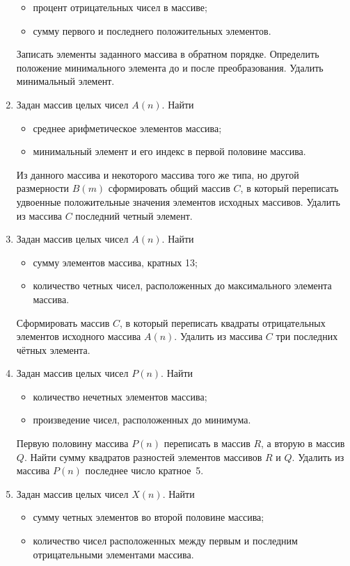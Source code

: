 \begin{enumerate}
\begin{itemize}
\item процент отрицательных чисел в массиве;
\item сумму первого и последнего положительных элементов.
\end{itemize}
Записать элементы заданного массива в обратном порядке. Определить положение минимального элемента до и после
преобразования. Удалить минимальный элемент.
\item Задан массив целых чисел $A(n)$. Найти
\begin{itemize}
\item среднее арифметическое элементов массива;
\item минимальный элемент и его индекс в первой половине массива.
\end{itemize}
Из данного массива и некоторого массива того же типа, но другой размерности $B(m)$
сформировать общий массив $C$, в который переписать удвоенные положительные значения элементов исходных
массивов. Удалить из массива $C$ последний четный элемент.
\item Задан массив целых чисел $A(n)$. Найти
\begin{itemize}
\item сумму элементов массива, кратных 13;
\item количество четных чисел, расположенных до максимального элемента массива.
\end{itemize}
Сформировать массив $C$, в который переписать квадраты отрицательных элементов исходного массива
$A(n)$. Удалить из массива $C$ три последних чётных элемента.
\item Задан массив целых чисел $P(n)$. Найти
\begin{itemize}
\item количество нечетных элементов массива;
\item произведение чисел, расположенных до минимума.
\end{itemize}
Первую половину массива $P(n)$ переписать в массив $R$, а вторую в
массив $Q$. Найти сумму квадратов разностей элементов массивов $R$ и
$Q$. Удалить из массива $P(n)$ последнее число кратное~5.
\item Задан массив целых чисел $X(n)$. Найти
\begin{itemize}
\item сумму четных элементов во второй половине массива;
\item количество чисел расположенных между первым и последним отрицательными элементами массива.
\end{itemize}

\end{enumerate}
